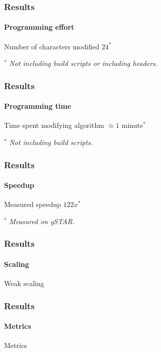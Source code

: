 \documentclass{beamer}
\begin{document}
\begin{frame}
  \frametitle{Results}
  \framesubtitle{Programming effort}
  \begin{block}{Number of characters modified}
    \centering
    \vspace{1cm}
    {\Huge $24^*$}
    \vspace{1cm}
  \end{block}
  $^*$ {\it Not including build scripts or including headers.}
\end{frame}

\begin{frame}
  \frametitle{Results}
  \framesubtitle{Programming time}
  \begin{block}{Time spent modifying algorithm}
    \centering
    \vspace{1cm}
    {\Huge $\approx 1$ minute$^*$}
    \vspace{1cm}
  \end{block}
  $^*$ {\it Not including build scripts.}
\end{frame}

\begin{frame}
  \frametitle{Results}
  \framesubtitle{Speedup}
  \begin{block}{Measured speedup}
    \centering
    \vspace{1cm}
    {\Huge $122x^*$}
    \vspace{1cm}
  \end{block}
  $^*$ {\it Measured on gSTAR.}
\end{frame}

\begin{frame}
  \frametitle{Results}
  \framesubtitle{Scaling}
  \begin{block}{Weak scaling}
    \centering
    \vspace{1cm}
    \vspace{1cm}
  \end{block}
\end{frame}

\begin{frame}
  \frametitle{Results}
  \framesubtitle{Metrics}
  \begin{block}{Metrics}
    \vspace{1cm}
    \hspace{0.5cm}{\Huge $x5$ per character changed.} \\
    \hspace{0.5cm}{\Huge $x2$ per second spent.}
    \vspace{1cm}
  \end{block}
\end{frame}
\end{document}
